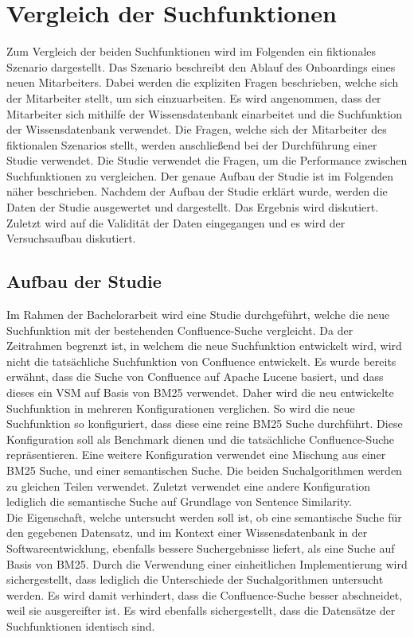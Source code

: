 \chapter{Vergleich der Suchfunktionen}
\label{chap:vergleich-der-suchfunktionen}
Zum Vergleich der beiden Suchfunktionen wird im Folgenden ein fiktionales Szenario dargestellt.
Das Szenario beschreibt den Ablauf des Onboardings eines neuen Mitarbeiters.
Dabei werden die expliziten Fragen beschrieben, welche sich der Mitarbeiter stellt, um sich einzuarbeiten.
Es wird angenommen, dass der Mitarbeiter sich mithilfe der Wissensdatenbank einarbeitet und die Suchfunktion der Wissensdatenbank verwendet.
Die Fragen, welche sich der Mitarbeiter des fiktionalen Szenarios stellt, werden anschließend bei der Durchführung einer Studie verwendet.
Die Studie verwendet die Fragen, um die Performance zwischen Suchfunktionen zu vergleichen.
Der genaue Aufbau der Studie ist im Folgenden näher beschrieben.
Nachdem der Aufbau der Studie erklärt wurde, werden die Daten der Studie ausgewertet und dargestellt.
Das Ergebnis wird diskutiert.
Zuletzt wird auf die Validität der Daten eingegangen und es wird der Versuchsaufbau diskutiert.

\section{Aufbau der Studie}
Im Rahmen der Bachelorarbeit wird eine Studie durchgeführt, welche die neue Suchfunktion mit der bestehenden Confluence-Suche vergleicht.
Da der Zeitrahmen begrenzt ist, in welchem die neue Suchfunktion entwickelt wird, wird nicht die tatsächliche Suchfunktion von Confluence entwickelt.
Es wurde bereits erwähnt, dass die Suche von Confluence auf Apache Lucene basiert, und dass dieses ein VSM auf Basis von BM25 verwendet.
Daher wird die neu entwickelte Suchfunktion in mehreren Konfigurationen verglichen.
So wird die neue Suchfunktion so konfiguriert, dass diese eine reine BM25 Suche durchführt.
Diese Konfiguration soll als Benchmark dienen und die tatsächliche Confluence-Suche repräsentieren.
Eine weitere Konfiguration verwendet eine Mischung aus einer BM25 Suche, und einer semantischen Suche.
Die beiden Suchalgorithmen werden zu gleichen Teilen verwendet.
Zuletzt verwendet eine andere Konfiguration lediglich die semantische Suche auf Grundlage von Sentence Similarity.\\

Die Eigenschaft, welche untersucht werden soll ist, ob eine semantische Suche für den gegebenen Datensatz, und im Kontext einer Wissensdatenbank in der Softwareentwicklung, ebenfalls bessere Suchergebnisse liefert, als eine Suche auf Basis von BM25.
Durch die Verwendung einer einheitlichen Implementierung wird sichergestellt, dass lediglich die Unterschiede der Suchalgorithmen untersucht werden.
Es wird damit verhindert, dass die Confluence-Suche besser abschneidet, weil sie ausgereifter ist.
Es wird ebenfalls sichergestellt, dass die Datensätze der Suchfunktionen identisch sind.\\

